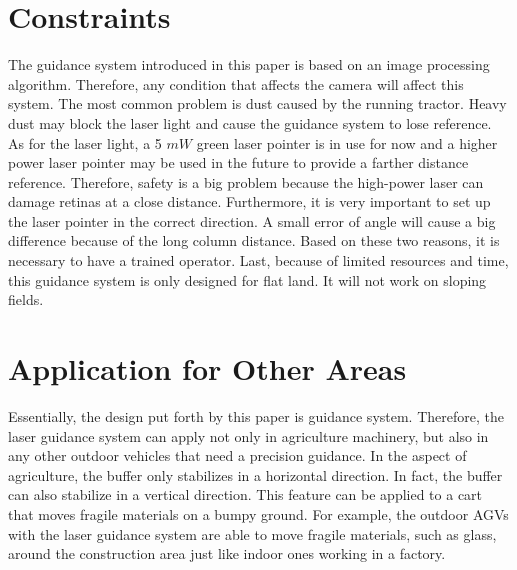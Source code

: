 \section{Constraints}
The guidance system introduced in this paper is based on an image processing algorithm. Therefore, any condition that affects the camera will affect this system. The most common problem is dust caused by the running tractor. Heavy dust may block the laser light and cause the guidance system to lose reference. As for the laser light, a 5 $mW$ green laser pointer is in use for now and a higher power laser pointer may be used in the future to provide a farther distance reference. Therefore, safety is a big problem because the high-power laser can damage retinas at a close distance. Furthermore, it is very important to set up the laser pointer in the correct direction. A small error of angle will cause a big difference because of the long column distance. Based on these two reasons, it is necessary to have a trained operator. Last, because of limited resources and time, this guidance system is only designed for flat land. It will not work on sloping fields.


\section{Application for Other Areas}
Essentially, the design put forth by this paper is guidance system. Therefore, the laser guidance system can apply not only in agriculture machinery, but also in any other outdoor vehicles that need a precision guidance. In the aspect of agriculture, the buffer only stabilizes in a horizontal direction. In fact, the buffer can also stabilize in a vertical direction. This feature can be applied to a cart that moves fragile materials on a bumpy ground. For example, the outdoor AGVs with the laser guidance system are able to move fragile materials, such as glass, around the construction area just like indoor ones working in a factory. 


